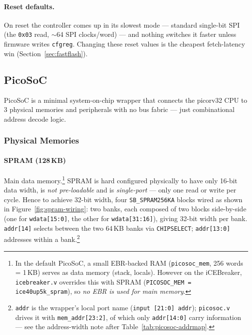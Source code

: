 \documentclass[9pt, a4paper]{extarticle}
\begin{document}
\paragraph{Reset defaults.} On reset the controller comes up in its slowest mode --- standard single-bit SPI (the \texttt{0x03} read, $\sim$64 SPI clocks/word) --- and nothing switches it faster unless firmware writes \texttt{cfgreg}. Changing these reset values is the cheapest fetch-latency win (Section~\ref{sec:fastflash}).

\newpage
\subsection{PicoSoC}
\label{sec:picosoc}

PicoSoC is a minimal system-on-chip wrapper that connects the picorv32 CPU to 3 physical memories and peripherals with no bus fabric --- just combinational address decode logic.

\subsubsection{Physical Memories}

\paragraph{SPRAM (128\,KB)} Main data memory.\footnote{In the default PicoSoC, a small EBR-backed RAM (\texttt{picosoc\_mem}, 256 words = 1\,KB) serves as data memory (stack, locals). However on the iCEBreaker, \texttt{icebreaker.v} overrides this with SPRAM (\texttt{PICOSOC\_MEM = ice40up5k\_spram}), so \textit{no EBR is used for main memory}.} SPRAM is hard configured physically to have only 16-bit data width, is \emph{not pre-loadable} and is \emph{single-port} --- only one read or write per cycle. Hence to achieve 32-bit width, four \texttt{SB\_SPRAM256KA} blocks wired as shown in Figure~\ref{fig:spram-wiring}: two banks, each composed of two blocks side-by-side (one for \texttt{wdata[15:0]}, the other for \texttt{wdata[31:16]}), giving 32-bit width per bank. \texttt{addr[14]} selects between the two 64\,KB banks via \texttt{CHIPSELECT}; \texttt{addr[13:0]} addresses within a bank.\footnote{\texttt{addr} is the wrapper's local port name (\texttt{input [21:0] addr}); \texttt{picosoc.v} drives it with \texttt{mem\_addr[23:2]}, of which only \texttt{addr[14:0]} carry information --- see the address-width note after Table~\ref{tab:picosoc-addrmap}.}
\end{document}
